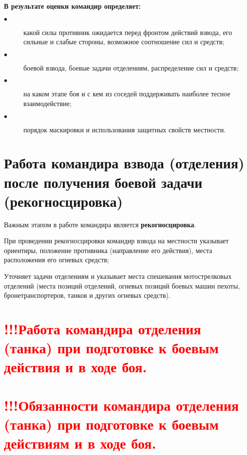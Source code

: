 \documentclass[12pt,a4paper]{report}
\begin{document}
\textbf{В результате оценки командир определяет:}
\begin{description}
\item[$\bullet$] какой силы противник ожидается перед фронтом действий взвода, его сильные и слабые стороны, возможное соотношение сил и средств;

\item[$\bullet$]боевой взвода, боевые задачи отделениям, распределение сил и средств;

\item[$\bullet$] на каком этапе боя и с кем из соседей поддерживать наиболее тесное взаимодействие;

\item[$\bullet$]порядок маскировки и использования защитных свойств местности.
\end{description}
\section{Работа командира взвода (отделения) после получения боевой задачи (рекогносцировка)}

Важным этапом в работе командира является \textbf{рекогносцировка}. 

При проведении рекогносцировки командир взвода на местности указывает ориентиры, положение противника (направление его действия), места расположения его огневых средств; 

Уточняет задачи отделениям и указывает места спешевания мотострелковых отделений (места позиций отделений, огневых позиций боевых машин пехоты, бронетранспортеров, танков и других огневых средств).


\section{\textcolor{red}{!!!Работа командира отделения (танка) при подготовке к боевым действия и в ходе боя.}}
\section{\textcolor{red}{!!!Обязанности командира отделения (танка) при подготовке к боевым действиям и в ходе боя.} }
\end{document}
